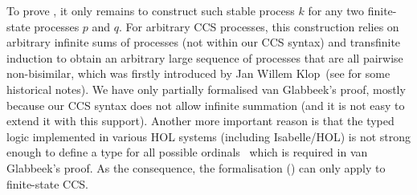 \documentclass[GCNS]{yincog}
\theoremstyle{remark}
\theoremstyle{theorem}
\theoremstyle{remark}
\begin{document}
To prove , it only remains to construct
such stable process $k$ for any two finite-state processes $p$ and
$q$. For arbitrary CCS processes, this construction relies on arbitrary
infinite sums of processes (not within our CCS syntax) and transfinite
induction to obtain an arbitrary large sequence of processes that are all
pairwise non-bisimilar, which was firstly introduced by Jan Willem Klop~(see
\cite{van2005characterisation} for some historical notes). We have only
partially formalised van Glabbeek's proof, mostly because our CCS syntax
does not allow infinite summation (and it is not easy to extend it with
this support). Another more important reason is that the typed logic implemented
in various HOL systems (including Isabelle/HOL) is not strong enough to
define a type for all possible ordinals~\cite{norrish2013ordinals} which
is required in van Glabbeek's proof. As the consequence, the formalisation
() can only apply to finite-state
CCS.
\end{document}
